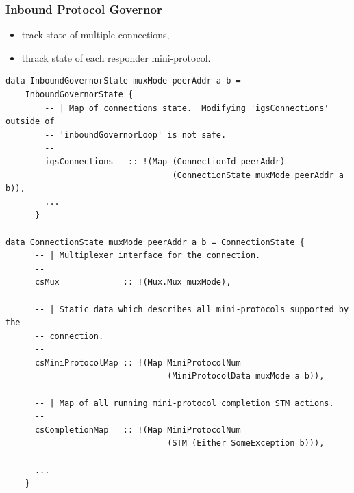 \documentclass[t,dvipsnames,hyperref={colorlinks,citecolor=NavyBlue,linkcolor=NavyBlue,anchorcolor=NavyBlue,urlcolor=NavyBlue}]{beamer}
\begin{document}
\begin{frame}[fragile]
  \frametitle{Inbound Protocol Governor}
  \tiny
  \begin{itemize}
    \item[\bullet] track state of multiple connections,
    \item[\bullet] thrack state of each responder mini-protocol.
  \end{itemize}
  \begin{verbatim}
data InboundGovernorState muxMode peerAddr a b =
    InboundGovernorState {
        -- | Map of connections state.  Modifying 'igsConnections' outside of
        -- 'inboundGovernorLoop' is not safe.
        --
        igsConnections   :: !(Map (ConnectionId peerAddr)
                                  (ConnectionState muxMode peerAddr a b)),
        ...
      }

data ConnectionState muxMode peerAddr a b = ConnectionState {
      -- | Multiplexer interface for the connection.
      --
      csMux             :: !(Mux.Mux muxMode),

      -- | Static data which describes all mini-protocols supported by the
      -- connection.
      --
      csMiniProtocolMap :: !(Map MiniProtocolNum
                                 (MiniProtocolData muxMode a b)),

      -- | Map of all running mini-protocol completion STM actions.
      --
      csCompletionMap   :: !(Map MiniProtocolNum
                                 (STM (Either SomeException b))),

      ...
    }
  \end{verbatim}
\end{frame}
\end{document}
